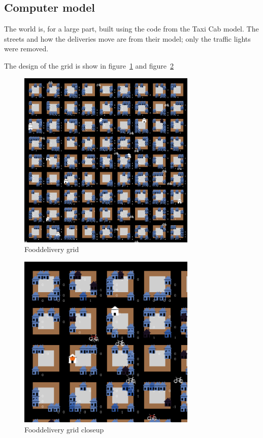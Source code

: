\subsection{Computer model}\label{subsec:computer-model}
The world is, for a large part, built using the code from the Taxi Cab model.
The streets and how the deliveries move are from their model; only the traffic lights were removed.

The design of the grid is show in figure~\ref{fig:grid} and figure~\ref{fig:grid closeup}
\begin{figure}
    \centering
    \includegraphics[width=8.5cm]{sections/pics/grid}
    \caption{Fooddelivery grid}
    \label{fig:grid}
\end{figure}
\begin{figure}
    \centering
    \includegraphics[width=8.5cm]{sections/pics/grid_closeup}
    \caption{Fooddelivery grid closeup}
    \label{fig:grid closeup}
\end{figure}
